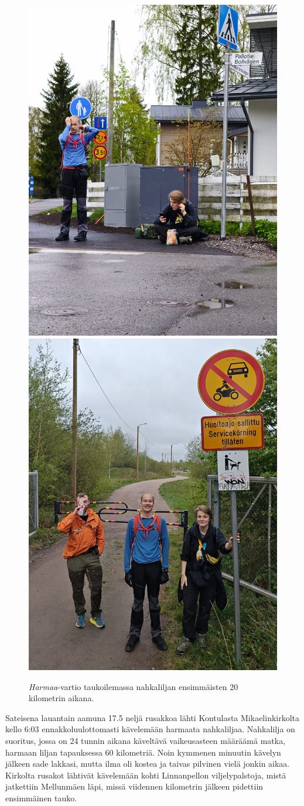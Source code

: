 \begin{multicols}{2}
\begin{figure}[!t]
\centering\includegraphics[width=.475\textwidth]{assets/nahkaliljaHarmaa1}\hfill\includegraphics[width=.475\textwidth]{assets/nahkaliljaHarmaa2}
\caption{\textit{Harmaa}-vartio taukoilemassa nahkaliljan ensimmäisten 20 kilometrin aikana.}
	\vspace*{-0.32cm}
\end{figure}

\noindent Sateisena lauantain aamuna 17.5 neljä rusakkoa lähti Kontulasta Mikaelinkirkolta kello 6:03 ennakkoluulottomasti kävelemään harmaata nahkaliljaa. Nahkalilja on suoritus, jossa on 24 tunnin aikana käveltävä vaikeusasteen määräämä matka, harmaan liljan tapauksessa 60 kilometriä. Noin kymmenen minuutin kävelyn jälkeen sade lakkasi, mutta ilma oli kostea ja taivas pilvinen vielä jonkin aikaa. Kirkolta rusakot lähtivät kävelemään kohti Linnanpellon viljelypalstoja, mistä jatkettiin Mellunmäen läpi, missä viidennen kilometrin jälkeen pidettiin ensimmäinen tauko.


\end{multicols}
